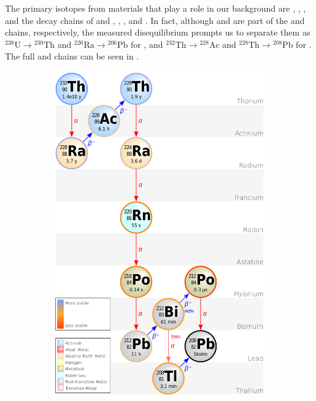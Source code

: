 The primary isotopes from materials that play a role in our background are , , , and the decay chains
of and , , , and .  In fact, although  and  are part of the
 and  chains, respectively, the measured disequilibrium prompts us to separate them as
$\mathrm{^{238}U} \rightarrow \mathrm{^{230}Th}$ and $\mathrm{^{226}Ra} \rightarrow \mathrm{^{206}Pb}$ for , and
$\mathrm{^{232}Th} \rightarrow \mathrm{^{228}Ac}$ and $\mathrm{^{228}Th} \rightarrow \mathrm{^{208}Pb}$ for .  The full
 and  chains can be seen in .

\begin{figure}
    \centering
    \begin{subfigure}[t]{0.5\textwidth}
        \centering
        \includegraphics[width=\textwidth]{Decay_Chain_of_Thorium-232}

\end{subfigure}
\end{figure}
